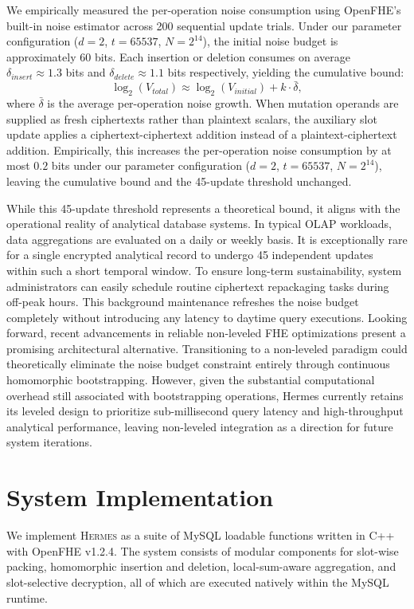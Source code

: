 \documentclass[sigconf,nonacm]{acmart}
\begin{document}
We empirically measured the per-operation noise consumption using OpenFHE's built-in noise estimator across 200 sequential update trials. 
Under our parameter configuration ($d=2$, $t=65537$, $N=2^{14}$), 
the initial noise budget is approximately 60 bits. 
Each insertion or deletion consumes on average $\delta_{insert} \approx 1.3$ bits and 
$\delta_{delete} \approx 1.1$ bits respectively, 
yielding the cumulative bound:
\[
\log_2(V_{total}) \approx \log_2(V_{initial}) + k \cdot \bar{\delta},
\]
where $\bar{\delta}$ is the average per-operation noise growth. 
When mutation operands are supplied as fresh ciphertexts rather than plaintext scalars, 
the auxiliary slot update applies a ciphertext-ciphertext addition instead of a plaintext-ciphertext addition.
Empirically, this increases the per-operation noise consumption by at most $0.2$ bits under our parameter configuration ($d = 2$, $t = 65537$, $N = 2^{14}$),
leaving the cumulative bound and the \mbox{45-update} threshold unchanged.

While this 45-update threshold represents a theoretical bound, it aligns with the operational reality of analytical database systems. In typical OLAP workloads, data aggregations are evaluated on a daily or weekly basis. It is exceptionally rare for a single encrypted analytical record to undergo 45 independent updates within such a short temporal window. To ensure long-term sustainability, system administrators can easily schedule routine ciphertext repackaging tasks during off-peak hours. This background maintenance refreshes the noise budget completely without introducing any latency to daytime query executions. Looking forward, recent advancements in reliable non-leveled FHE optimizations \cite{bchen_www26} present a promising architectural alternative. Transitioning to a non-leveled paradigm could theoretically eliminate the noise budget constraint entirely through continuous homomorphic bootstrapping. However, given the substantial computational overhead still associated with bootstrapping operations, Hermes currently retains its leveled design to prioritize sub-millisecond query latency and high-throughput analytical performance, leaving non-leveled integration as a direction for future system iterations. 

\section{System Implementation}
\label{sec:implementation}

We implement \textsc{Hermes} as a suite of MySQL loadable functions written in C++ with OpenFHE v1.2.4. The system consists of modular components for slot-wise packing, homomorphic insertion and deletion, local-sum-aware aggregation, and slot-selective decryption, all of which are executed natively within the MySQL runtime.
\end{document}
